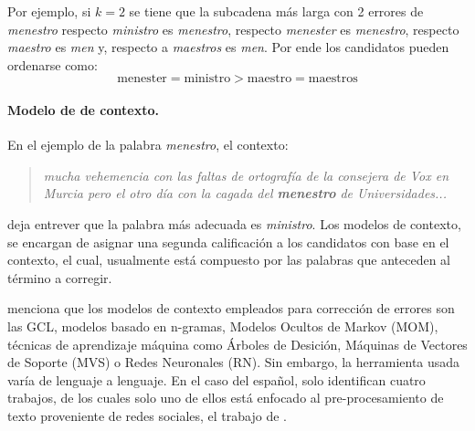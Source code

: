 Por ejemplo, si $k = 2$ se tiene que la subcadena más larga con 2 errores de \textit{menestro} respecto \textit{ministro} es \textit{menestro}, respecto \textit{menester} es \textit{menestro}, respecto \textit{maestro} es \textit{men} y, respecto a \textit{maestros} es \textit{men}. Por ende los candidatos pueden ordenarse como:
$$\mbox{menester} = \mbox{ministro} > \mbox{maestro} = \mbox{maestros}$$


\paragraph{Modelo de de contexto.} En el ejemplo de la palabra \textit{menestro}, el contexto:

\begin{quote}
	\textit{mucha vehemencia con las faltas de ortografía de la consejera de Vox en Murcia pero el otro día con la cagada del \textbf{menestro} de Universidades...}
\end{quote} 

deja entrever que la palabra más adecuada es \textit{ministro}. Los modelos de contexto, se encargan de asignar una segunda calificación a los candidatos con base en el contexto, el cual, usualmente está compuesto por las palabras que anteceden al término a corregir.

\cite{hladek2020survey}  menciona que los modelos de contexto empleados para corrección de errores son las GCL, modelos basado en n-gramas, Modelos Ocultos de Markov (MOM), técnicas de aprendizaje máquina como Árboles de Desición, Máquinas de Vectores de Soporte (MVS) o Redes Neuronales (RN). Sin embargo, la herramienta usada varía de lenguaje a lenguaje. En el caso del español, \cite{hladek2020survey} solo identifican cuatro trabajos, de los cuales solo uno de ellos está enfocado al pre-procesamiento de texto proveniente de redes sociales, el trabajo de \cite{melero2016selection}.

